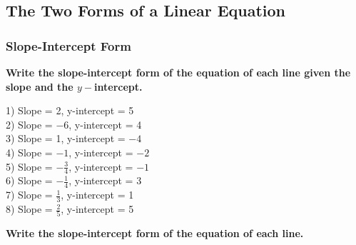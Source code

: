\documentclass[12pt]{book}
\theoremstyle{definition}
\begin{document}
\subsection*{The Two Forms of a Linear Equation}
\subsubsection*{Slope-Intercept Form}
{\bf Write the slope-intercept form of the equation of each line given the slope and the $y-$intercept.}
\begin{multicols}{2}
  1) Slope = 2, y-intercept = 5\\
  2) Slope = $- 6$, y-intercept = 4\\
  3) Slope = 1, y-intercept = $- 4$\\
  4) Slope = $- 1$, y-intercept = $- 2$\\
  5) Slope = $- \frac{3}{4}$, y-intercept = $- 1$\\
  6) Slope = $- \frac{1}{4}$, y-intercept = 3\\
  7) Slope = $\frac{1}{3}$, y-intercept = 1\\
  8) Slope = $\frac{2}{5}$, y-intercept = 5
\end{multicols}
{\bf Write the slope-intercept form of the equation of each line.}
\end{document}
